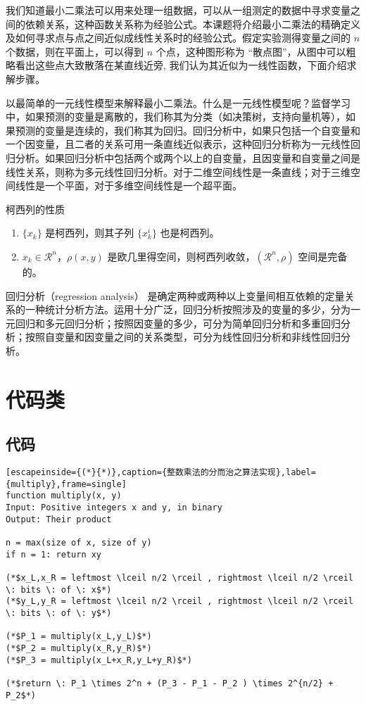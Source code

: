 \documentclass[math,logic,quote,code,mode=simple]{codedumpnote}
\begin{document}
我们知道最小二乘法可以用来处理一组数据，可以从一组测定的数据中寻求变量之间的依赖关系，这种函数关系称为经验公式。本课题将介绍最小二乘法的精确定义及如何寻求点与点之间近似成线性关系时的经验公式。假定实验测得变量之间的 $n$ 个数据，则在平面上，可以得到 $n$ 个点，这种图形称为 “散点图”，从图中可以粗略看出这些点大致散落在某直线近旁, 我们认为其近似为一线性函数，下面介绍求解步骤。

以最简单的一元线性模型来解释最小二乘法。什么是一元线性模型呢？监督学习中，如果预测的变量是离散的，我们称其为分类（如决策树，支持向量机等），如果预测的变量是连续的，我们称其为回归。回归分析中，如果只包括一个自变量和一个因变量，且二者的关系可用一条直线近似表示，这种回归分析称为一元线性回归分析。如果回归分析中包括两个或两个以上的自变量，且因变量和自变量之间是线性关系，则称为多元线性回归分析。对于二维空间线性是一条直线；对于三维空间线性是一个平面，对于多维空间线性是一个超平面。

\begin{property}\label{property:cauchy}
柯西列的性质
\begin{enumerate}
\item $\{x_k\}$ 是柯西列，则其子列 $\{x_k^i\}$ 也是柯西列。
\item $x_k\in \mathcal{R}^n$，$\rho(x,y)$ 是欧几里得空间，则柯西列收敛，$(\mathcal{R}^n,\rho)$ 空间是完备的。
\end{enumerate}
\end{property}

\begin{conclusion}
回归分析（regression analysis） 是确定两种或两种以上变量间相互依赖的定量关系的一种统计分析方法。运用十分广泛，回归分析按照涉及的变量的多少，分为一元回归和多元回归分析；按照因变量的多少，可分为简单回归分析和多重回归分析；按照自变量和因变量之间的关系类型，可分为线性回归分析和非线性回归分析。
\end{conclusion}

\part{代码类}
\chapter{代码}
\begin{lstlisting}[escapeinside={(*}{*)},caption={整数乘法的分而治之算法实现},label={multiply},frame=single]
function multiply(x, y)
Input: Positive integers x and y, in binary
Output: Their product

n = max(size of x, size of y) 
if n = 1: return xy

(*$x_L,x_R = leftmost \lceil n/2 \rceil , rightmost \lceil n/2 \rceil \: bits \: of \: x$*)
(*$y_L,y_R = leftmost \lceil n/2 \rceil , rightmost \lceil n/2 \rceil \: bits \: of \: y$*)

(*$P_1 = multiply(x_L,y_L)$*)
(*$P_2 = multiply(x_R,y_R)$*)
(*$P_3 = multiply(x_L+x_R,y_L+y_R)$*)

(*$return \: P_1 \times 2^n + (P_3 - P_1 - P_2 ) \times 2^{n/2} + P_2$*)
\end{lstlisting}
\end{document}
